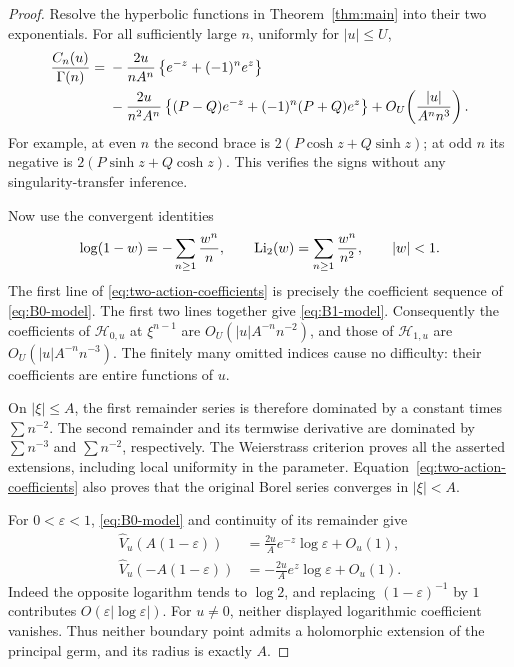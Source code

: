 \begin{proof}
Resolve the hyperbolic functions in Theorem~\ref{thm:main} into their two
exponentials. For all sufficiently large $n$, uniformly for $|u|\le U$,
\begin{align}
 \frac{C_n(u)}{\Gamma(n)}
 ={}&-\frac{2u}{nA^n}
       \left\{e^{-z}+(-1)^n e^z\right\}\notag\\
 &-\frac{2u}{n^2A^n}
       \left\{(P-Q)e^{-z}+(-1)^n(P+Q)e^z\right\}
       +O_U\!\left(\frac{|u|}{A^n n^3}\right).
 \label{eq:two-action-coefficients}
\end{align}
For example, at even $n$ the second brace is
$2(P\cosh z+Q\sinh z)$; at odd $n$ its negative is
$2(P\sinh z+Q\cosh z)$. This verifies the signs without any
singularity-transfer inference.

Now use the convergent identities
\[
 \log(1-w)=-\sum_{n\ge1}\frac{w^n}{n},
 \qquad
 \operatorname{Li}_2(w)=\sum_{n\ge1}\frac{w^n}{n^2},
 \qquad |w|<1.
\]
The first line of \eqref{eq:two-action-coefficients} is precisely the
coefficient sequence of \eqref{eq:B0-model}. The first two lines together
give \eqref{eq:B1-model}. Consequently the coefficients of
$\mathcal H_{0,u}$ at $\xi^{n-1}$ are
$O_U(|u|A^{-n}n^{-2})$, and those of $\mathcal H_{1,u}$ are
$O_U(|u|A^{-n}n^{-3})$. The finitely many omitted indices cause no
difficulty: their coefficients are entire functions of $u$.

On $|\xi|\le A$, the first remainder series is therefore dominated by a
constant times $\sum n^{-2}$. The second remainder and its termwise
derivative are dominated by $\sum n^{-3}$ and $\sum n^{-2}$, respectively.
The Weierstrass criterion proves all the asserted extensions, including
local uniformity in the parameter. Equation~\eqref{eq:two-action-coefficients}
also proves that the original Borel series converges in $|\xi|<A$.

For $0<\varepsilon<1$, \eqref{eq:B0-model} and continuity of its remainder
give
\begin{align}
 \widehat V_u(A(1-\varepsilon))
 &=\frac{2u}{A}e^{-z}\log\varepsilon+O_u(1),\label{eq:radial-positive}\\
 \widehat V_u(-A(1-\varepsilon))
 &=-\frac{2u}{A}e^z\log\varepsilon+O_u(1).\label{eq:radial-negative}
\end{align}
Indeed the opposite logarithm tends to $\log2$, and replacing
$(1-\varepsilon)^{-1}$ by $1$ contributes
$O(\varepsilon|\log\varepsilon|)$. For $u\ne0$, neither displayed
logarithmic coefficient vanishes. Thus neither boundary point admits a
holomorphic extension of the principal germ, and its radius is exactly $A$.
\end{proof}

